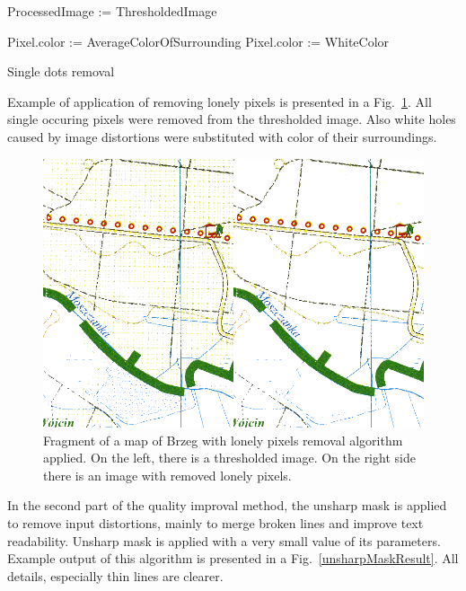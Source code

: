 \documentclass[a4paper,onecolumn,oneside,12pt]{memoir}
\begin{document}
\begin{algorithm}[!ht]

  ProcessedImage := ThresholdedImage\;

  {
    {
      {
        Pixel.color := AverageColorOfSurrounding\;
      }
    }
    {
      {
        Pixel.color := WhiteColor\;
      }
    }
  }


  \caption{Single dots removal}
  \label{singleDotsRemovalAlgorithm}
\end{algorithm}

Example of application of removing lonely pixels is presented in a Fig.~\ref{removeLonePixelsResult}.
All single occuring pixels were removed from the thresholded image. Also white holes caused by image
distortions were substituted with color of their surroundings.

\begin{figure}[!ht]
\begin{center}
\includegraphics[scale=0.4]{images/removeLonePixelsResult.png}
\caption{Fragment of a map of Brzeg with lonely pixels removal algorithm applied.
On the left, there is a thresholded image. On the right side there is an image with removed
lonely pixels.}
\label{removeLonePixelsResult}
\end{center}
\end{figure}

In the second part of the quality improval method, the unsharp mask is applied to remove input
distortions, mainly to merge broken lines and improve text readability. Unsharp mask is applied with
a very small value of its parameters. Example output of this algorithm is presented in a 
Fig.~\ref{unsharpMaskResult}. All details, especially thin lines are clearer.
\end{document}

